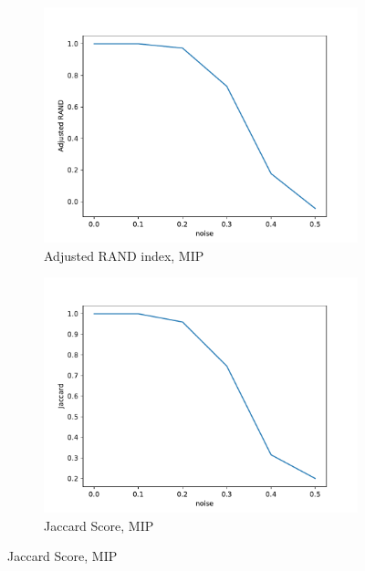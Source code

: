 \begin{figure}
	\begin{center}
		\begin{subfigure}[b]{0.4\textwidth}
			\centering
			\includegraphics[width=\textwidth]{tex/out/synthetic_exact/model2_noise_adj_rand.pdf}
			\caption{Adjusted RAND index, MIP}
			\label{fig:tex/out/synthetic_exact/model2_noise_adj_rand.pdf}
		\end{subfigure}
		\quad
		\begin{subfigure}[b]{0.4\textwidth}
			\centering
			\includegraphics[width=\textwidth]{tex/out/synthetic_exact/model2_noise_jaccard.pdf}
			\caption{Jaccard Score, MIP}
			\label{fig:tex/out/synthetic_exact/_noise_jaccard.pdf}

\end{subfigure}
\end{center}
\end{figure}
